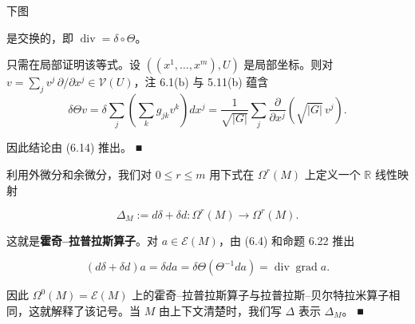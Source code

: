 \begin{proposition}

下图


是交换的，即 $ \operatorname{div} = \delta\circ\Theta $。

\proofhead
只需在局部证明该等式。设 $ ((x^{1},\ldots,x^{m}),U) $ 是局部坐标。则对 $ v = \sum_{j} v^{j}\, \partial/\partial x^{j} \in \mathcal{V}(U) $，注 6.1(b) 与 5.11(b) 蕴含
\[
\delta\Theta v = \delta\sum_{j}\left(\sum_{k} g_{jk}v^{k}\right) dx^{j} = \frac{1}{\sqrt{|G|}}\sum_{j}\frac{\partial}{\partial x^{j}}\left(\sqrt{|G|}\, v^{j}\right) .
\]

因此结论由 (6.14) 推出。 \nobreak\hspace{0.35em}■

\end{proposition}

利用外微分和余微分，我们对 $ 0 \le r \le m $ 用下式在 $ \Omega^{r}(M) $ 上定义一个 $ \mathbb{R} $ 线性映射

\begin{equation}
\Delta_{M} := d\delta + \delta d : \Omega^{r}(M) \to \Omega^{r}(M) .\tag{6.35}
\end{equation}

这就是\textbf{霍奇–拉普拉斯算子}。对 $ a \in \mathcal{E}(M) $，由 (6.4) 和命题 6.22 推出

\[
(d\delta + \delta d)a = \delta d a = \delta\Theta(\Theta^{-1}da) = \operatorname{div}\operatorname{grad} a .
\]

因此 $ \Omega^{0}(M) = \mathcal{E}(M) $ 上的霍奇–拉普拉斯算子与拉普拉斯–贝尔特拉米算子相同，这就解释了该记号。当 $ M $ 由上下文清楚时，我们写 $ \Delta $ 表示 $ \Delta_{M} $。 \nobreak\hspace{0.35em}■

